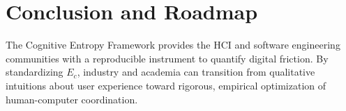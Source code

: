\documentclass[11pt,a4paper]{article}
\begin{document}
\section{Conclusion and Roadmap}
The Cognitive Entropy Framework provides the HCI and software engineering communities with a reproducible instrument to quantify digital friction. By standardizing $E_c$, industry and academia can transition from qualitative intuitions about user experience toward rigorous, empirical optimization of human-computer coordination.



\end{document}
